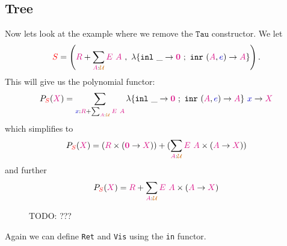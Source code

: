 \documentclass[twoside,11pt,openright]{report}
\newcommand*{\term}[1]{\textcolor{blue!80!black}{#1}}
\newcommand*{\type}[1]{\textcolor{magenta!90!black}{#1}}
\newcommand*{\container}[1]{\textcolor{red}{#1}}
\newcommand*{\universe}[1]{\textcolor{orange!80!black}{#1}}
\newcommand*{\empt}{\type{\textbf{0}}}
\begin{document}
\subsection{Tree}
Now lets look at the example where we remove the \(\mathtt{Tau}\) constructor. We let
\begin{equation}
\container{S} = \left(\type{R} + \sum_{\type{A} : \universe{\mathcal{U}}} \type{E}~\type{A}~,~\lambda \{ \texttt{inl}~\_ \rightarrow \empt ~;~ \texttt{inr}~(\type{A},\term{e}) \rightarrow \type{A} \} \right).
\end{equation}
This will give us the polynomial functor:
\begin{equation}
  P_{\container{S}}(\type{X}) = \sum_{\term{x} : \type{R} + \sum_{\type{A} : \universe{\mathcal{U}}} \type{E}~\type{A}} \lambda \{ \texttt{inl}~\_ \rightarrow \empt ~;~ \texttt{inr}~(\type{A},\term{e}) \rightarrow \type{A} \}~\term{x} \rightarrow \type{X}
\end{equation}
which simplifies to
\begin{equation}
  P_{\container{S}}(\type{X}) = (\type{R} \times (\empt \rightarrow \type{X})) + (\sum_{\type{A} : \universe{\mathcal{U}}} \type{E}~\type{A} \times (\type{A} \rightarrow \type{X}))
\end{equation}
and further
\begin{equation}
  P_{\container{S}}(\type{X}) = \type{R} + \sum_{\type{A} : \universe{\mathcal{U}}} \type{E}~\type{A} \times (\type{A} \rightarrow \type{X})
\end{equation}

\begin{figure}[h]
  \centering
  \caption{TODO: ???}
\end{figure}
\noindent Again we can define \texttt{Ret} and \texttt{Vis} using the \texttt{in} functor.
\end{document}
